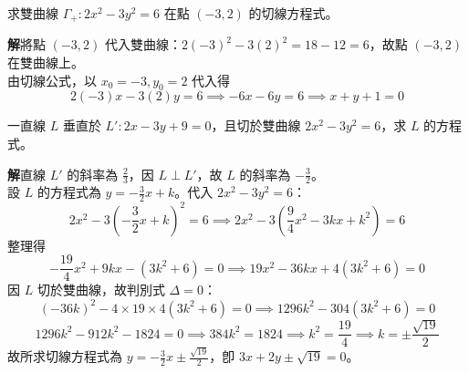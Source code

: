 \begin{example}
求雙曲線 $\Gamma_+ : 2x^2 - 3y^2 = 6$ 在點 $(-3, 2)$ 的切線方程式。

\textbf{解}\quad 將點 $(-3, 2)$ 代入雙曲線：$2(-3)^2 - 3(2)^2 = 18 - 12 = 6$，故點 $(-3, 2)$ 在雙曲線上。\\
由切線公式，以 $x_0 = -3, y_0 = 2$ 代入得
\[ 2(-3)x - 3(2)y = 6 \implies -6x - 6y = 6 \implies x + y + 1 = 0 \]
\end{example}

\begin{example}
一直線 $L$ 垂直於 $L': 2x - 3y + 9 = 0$，且切於雙曲線 $2x^2 - 3y^2 = 6$，求 $L$ 的方程式。

\textbf{解}\quad 直線 $L'$ 的斜率為 $\frac{2}{3}$，因 $L \perp L'$，故 $L$ 的斜率為 $-\frac{3}{2}$。\\
設 $L$ 的方程式為 $y = -\frac{3}{2}x + k$。代入 $2x^2 - 3y^2 = 6$：
\[ 2x^2 - 3\left(-\frac{3}{2}x + k\right)^2 = 6 \implies 2x^2 - 3\left(\frac{9}{4}x^2 - 3kx + k^2\right) = 6 \]
整理得
\[ -\frac{19}{4}x^2 + 9kx - (3k^2 + 6) = 0 \implies 19x^2 - 36kx + 4(3k^2 + 6) = 0 \]
因 $L$ 切於雙曲線，故判別式 $\Delta = 0$：
\[ (-36k)^2 - 4 \times 19 \times 4(3k^2 + 6) = 0 \implies 1296k^2 - 304(3k^2 + 6) = 0 \]
\[ 1296k^2 - 912k^2 - 1824 = 0 \implies 384k^2 = 1824 \implies k^2 = \frac{19}{4} \implies k = \pm \frac{\sqrt{19}}{2} \]
故所求切線方程式為 $y = -\frac{3}{2}x \pm \frac{\sqrt{19}}{2}$，卽 $3x + 2y \pm \sqrt{19} = 0$。
\end{example}


